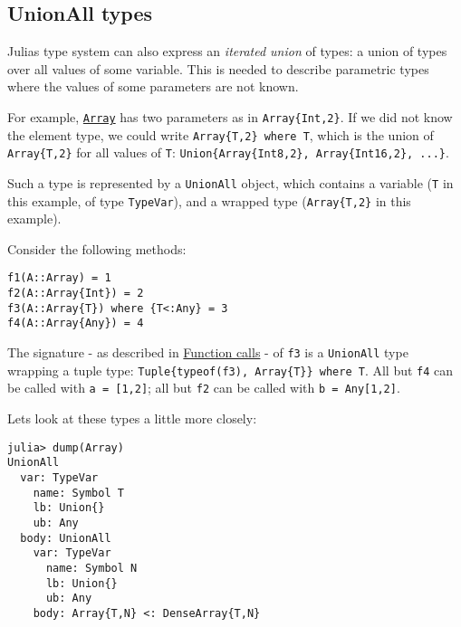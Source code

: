 \hypertarget{11911810306869937851}{}


\subsection{UnionAll types}



Julia{\textquotesingle}s type system can also express an \emph{iterated union} of types: a union of types over all values of some variable. This is needed to describe parametric types where the values of some parameters are not known.



For example, \hyperlink{15492651498431872487}{\texttt{Array}} has two parameters as in \texttt{Array\{Int,2\}}. If we did not know the element type, we could write \texttt{Array\{T,2\} where T}, which is the union of \texttt{Array\{T,2\}} for all values of \texttt{T}: \texttt{Union\{Array\{Int8,2\}, Array\{Int16,2\}, ...\}}.



Such a type is represented by a \texttt{UnionAll} object, which contains a variable (\texttt{T} in this example, of type \texttt{TypeVar}), and a wrapped type (\texttt{Array\{T,2\}} in this example).



Consider the following methods:




\begin{verbatim}
f1(A::Array) = 1
f2(A::Array{Int}) = 2
f3(A::Array{T}) where {T<:Any} = 3
f4(A::Array{Any}) = 4
\end{verbatim}



The signature - as described in \href{@ref}{Function calls} - of \texttt{f3} is a \texttt{UnionAll} type wrapping a tuple type: \texttt{Tuple\{typeof(f3), Array\{T\}\} where T}. All but \texttt{f4} can be called with \texttt{a = [1,2]}; all but \texttt{f2} can be called with \texttt{b = Any[1,2]}.



Let{\textquotesingle}s look at these types a little more closely:




\begin{verbatim}
julia> dump(Array)
UnionAll
  var: TypeVar
    name: Symbol T
    lb: Union{}
    ub: Any
  body: UnionAll
    var: TypeVar
      name: Symbol N
      lb: Union{}
      ub: Any
    body: Array{T,N} <: DenseArray{T,N}
\end{verbatim}



